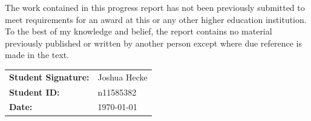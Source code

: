
The work contained in this progress report has not been previously submitted to meet requirements for an award at this or any other higher education institution. To the best of my knowledge and belief, the report contains no material previously published or written by another person except where due reference is made in the text.

\vspace{3cm}

\noindent
\begin{tabular}{ll}
\textbf{Student Signature:} & Joshua Hecke \\
\addlinespace
\textbf{Student ID:}        & n11585382 \\
\addlinespace
\textbf{Date:}              & \today \\
\end{tabular}